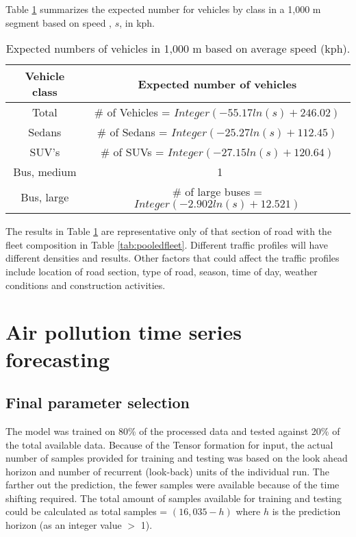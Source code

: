 Table \ref{tb4:expectedvehicles} summarizes the expected number for vehicles by class in a 1,000 m segment based on speed , $s$, in kph.
%
\begin{table}[!htb]
\centering
\caption{ Expected numbers of vehicles in 1,000 m based on average speed (kph).}
\label{tb4:expectedvehicles}
\begin{tabular}{@{}cc@{}}
\toprule
\textbf{Vehicle class} & \textbf{Expected number of vehicles } \\ \midrule
Total & \# of Vehicles = $Integer(-55.17ln(s) + 246.02)$ \\
Sedans & \# of Sedans = $Integer (-25.27ln(s) + 112.45)$ \\
SUV's & \# of SUVs = $Integer (-27.15ln(s) + 120.64)$ \\
Bus, medium & \ 1 \\
Bus, large & \# of large buses = $Integer (-2.902ln(s) + 12.521)$ \\ \bottomrule
\end{tabular}
\end{table}
%
The results in Table \ref{tb4:expectedvehicles} are representative only of that section of road with the fleet composition in Table \ref{tab:pooledfleet}.  Different traffic profiles will have different densities and results.  Other factors that could affect the traffic profiles include location of road section, type of road, season, time of day, weather conditions and construction activities. 

\clearpage
\section{Air pollution time series forecasting}

\subsection{Final parameter selection}
The model was trained on 80\% of the processed data and tested against 20\% of the total available data. Because of the Tensor formation for input, the actual number of samples provided for training and testing was based on the look ahead horizon and number of recurrent (look-back) units of the individual run. The farther out the prediction, the fewer samples were available because of the time shifting required. The total amount of samples available for training and testing could be calculated as total samples = $(16,035 - h)$ where $h$ is the prediction horizon (as an integer value $>$ 1). 

